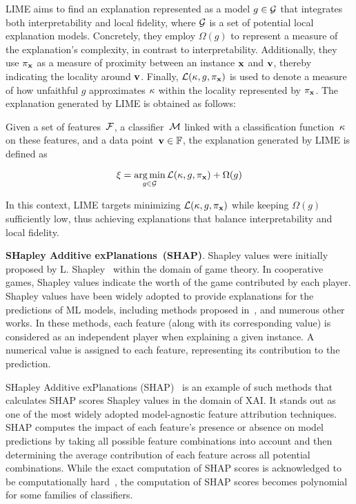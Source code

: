 LIME aims to find an explanation represented as a model $g \in {\mathcal{G}}$ that 
integrates both interpretability and local fidelity, where ${\mathcal{G}}$ is a 
set of potential local explanation models. 
%
Concretely, they employ $\Omega(g)$ to represent a measure of the explanation's 
complexity, in contrast to interpretability.
%
Additionally, they use $\pi_{\mathbf{x}}$ as a measure of proximity between an instance 
$\mathbf{x}$ and $\mathbf{v}$, thereby indicating the locality around $\mathbf{v}$.
%
Finally, ${\mathcal{L}}(\kappa, g, \pi_{\mathbf{x}})$ is used to denote a measure of how unfaithful 
$g$ approximates $\kappa$ within the locality represented by $\pi_{\mathbf{x}}$.
%
The explanation generated by LIME is obtained as follows:

\begin{definition}[LIME] \label{def:lime}
	Given a set of features~${\mathcal{F}}$, a classifier~${\mathcal{M}}$ linked with a classification
	function~$\kappa$ on these features, and a data point~$\mathbf{v} \in \mathbb{F}$,
	the explanation generated by LIME is defined as

	\begin{equation} \label{eq:lime}
		\xi = \operatorname*{arg\,min}_{g \in {\mathcal{G}}} {\mathcal{L}}(\kappa, g, \pi_{\mathbf{x}}) + \Omega(g)
	\end{equation}
\end{definition}

In this context, LIME targets minimizing ${\mathcal{L}}(\kappa, g, \pi_{\mathbf{x}})$ 
while keeping  $\Omega(g)$ sufficiently low,
thus achieving explanations that balance interpretability and local fidelity.

\textbf{SHapley Additive exPlanations~(SHAP)}. %
Shapley values were initially proposed by L. Shapley~\cite{shapley-ctg53,shapley-19}
within the domain of game theory.
%
In cooperative games, Shapley values indicate the worth of the game contributed by each player.
%
Shapley values have been widely adopted to provide explanations for the predictions of ML models, 
including methods proposed in~\cite{sk-jmlr10,sk-kis14,lundberg-nips17}, and numerous other works.
%
In these methods, each feature (along with its corresponding value) is considered as 
an independent player when explaining a given instance.
%
A numerical value is assigned to each feature, representing its contribution to the prediction.

SHapley Additive exPlanations (SHAP)~\cite{lundberg-nips17,molnar-bk20} is an example of such
methods that calculates SHAP scores  Shapley values in the domain of XAI.
%
It stands out as one of the most widely adopted model-agnostic feature attribution techniques.
%
SHAP computes the impact of each feature's presence or absence on model predictions 
by taking all possible feature combinations into account and 
then determining the average contribution of each feature across all potential combinations.
%
While the exact computation of SHAP scores is acknowledged to be 
computationally hard~\cite{barcelo-aaai21,barcelo-corr21}, 
the computation of SHAP scores becomes polynomial for some families of classifiers.

